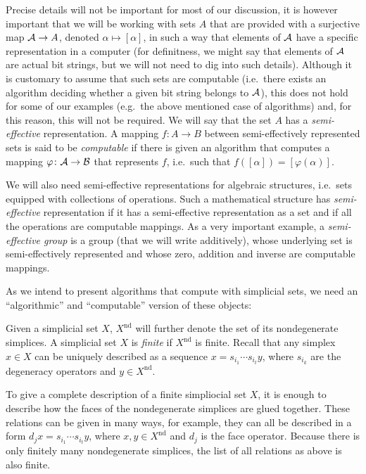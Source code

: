 \documentclass[12pt,a4wide]{article}
\theoremstyle{plain}
\theoremstyle{definition}
\newcommand{\heading}[1]{\vspace{1ex}\par\noindent{\bf\boldmath #1}}
\renewcommand\:{\colon}
\newcommand{\ndg}{\mathrm{nd}}
\begin{document}
Precise details will not be important for most of our discussion, it is however important that we will be working with sets $A$ that are provided with a surjective map $\mathcal A \to A$, denoted $\alpha \mapsto [\alpha]$, in such a way that elements of $\mathcal A$ have a specific representation in a computer (for definitness, we might say that elements of $\mathcal A$ are actual bit strings, but we will not need to dig into such details). Although it is customary to assume that such sets are computable (i.e.\ there exists an algorithm deciding whether a given bit string belongs to $\mathcal A$), this does not hold for some of our examples (e.g.\ the above mentioned case of algorithms) and, for this reason, this will not be required. We will say that the set $A$ has a \emph{semi-effective} representation. A mapping $f \colon A \to B$ between semi-effectively represented sets is said to be \emph{computable} if there is given an algorithm that computes a mapping $\varphi \colon \mathcal A \to \mathcal B$ that represents $f$, i.e.\ such that $f([\alpha]) = [\varphi(\alpha)]$.

We will also need semi-effective representations for algebraic structures, i.e.\ sets equipped with collections of operations. Such a mathematical structure has \emph{semi-effective} representation if it has a semi-effective representation as a set and if all the operations are computable mappings. As a very important example, a \emph{semi-effective group} is a group (that we will write additively), whose underlying set is semi-effectively represented and whose zero, addition and inverse are computable mappings.

\heading{Simplicial sets}
As we intend to present algorithms that compute with simplicial sets, we need an ``algorithmic'' and ``computable'' version of these objects:

Given a simplicial set $X$, $X^\ndg$ will further denote the set of its nondegenerate simplices. A simplicial set $X$ is \emph{finite} if  $X^\ndg$ is finite. Recall that any simplex $x\in X$ can be uniquely described as a sequence $x =  s_{i_1} \cdots s_{i_t} y$, where $s_{i_k}$ are the degeneracy operators and $y\in X^\ndg$. 

To give a complete description of a finite simpliocial set $X$, it is enough to describe how the faces of the nondegenerate simplices are glued together. These relations can be given in many ways, for example, they can all be described in a form $d_{j} x = s_{i_1} \cdots s_{i_t} y$, where  $x, y \in X^\ndg$ and $d_j$ is the face operator. Because there is only finitely many nondegenerate simplices, the list of all relations as above is also finite. 
\end{document}
